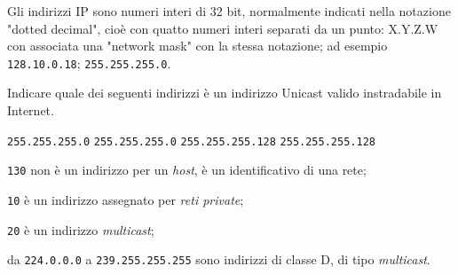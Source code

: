 \question[1]
Gli indirizzi IP sono numeri interi di 32 bit, normalmente indicati nella notazione "dotted decimal", cioè con quatto numeri interi separati da un punto: X.Y.Z.W con associata una "network mask" con la stessa notazione; ad esempio \texttt{128.10.0.18}; \texttt{255.255.255.0}.

Indicare quale dei seguenti indirizzi è un indirizzo Unicast valido instradabile in Internet.

\begin{checkboxes}
	\choice {} \texttt{255.255.255.0}
	\choice {} \texttt{255.255.255.0}
	\CorrectChoice {} \texttt{255.255.255.128}
	\choice {} \texttt{255.255.255.128}
\end{checkboxes}

\begin{solution}
\begin{compactlist}
		\item \texttt{130} non è un indirizzo per un \emph{host}, è un identificativo di una rete;
		\item \texttt{10} è un indirizzo assegnato per \emph{reti private};
		\item \texttt{20} è un indirizzo \emph{multicast};
		\item da \texttt{224.0.0.0} a \texttt{239.255.255.255} sono indirizzi di classe D, di tipo \emph{multicast}.
\end{compactlist}
\end{solution}
